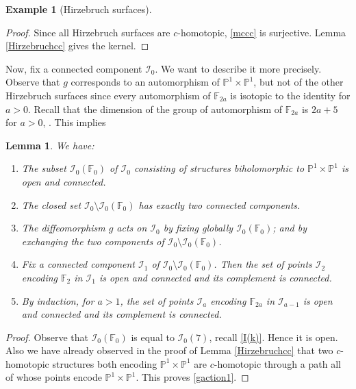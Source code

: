 \documentclass[JEP,XML,SOM,Unicode]{cedram}
\let\mathcal\mathscr
\theoremstyle{plain}
\newtheorem{lemma}[theorem]{Lemma}
\theoremstyle{definition}
\newtheorem{example}[theorem]{Example}
\theoremstyle{remark}
\numberwithin{equation}{section}
\newcommand{\cI}{\mathcal{I}}
\begin{document}
\begin{example}[Hirzebruch surfaces]
\begin{proof}
Since all Hirzebruch surfaces are $c$-homotopic, \eqref{mccc} is surjective. Lemma \ref{Hirzebruchcc} gives the kernel.
\end{proof}

Now, fix a connected component $\cI_0$. We want to describe it more precisely. Observe that $g$ corresponds to an automorphism of $\mathbb P^1\times\mathbb P^1$, but not of the other Hirzebruch surfaces since every automorphism of $\mathbb F_{2a}$ is isotopic to the identity for $a>0$. Recall that the dimension of the group of automorphism of $\mathbb F_{2a}$ is $2a+5$ for $a>0$, \cite[p.\,44]{MK}. This implies
\begin{lemma}
\label{gaction}
We have:
\begin{enumerate}
\item\label{gaction1}
The subset $\cI_0(\mathbb F_0)$ of $\cI_0$ consisting of structures biholomorphic to $\mathbb P^1\times\mathbb P^1$ is open and connected.
\item\label{gaction2}
The closed set $\cI_0\setminus \cI_0(\mathbb F_0)$ has exactly two connected components.
\item\label{gaction3}
The diffeomorphism $g$ acts on $\cI_0$ by fixing globally $\cI_0(\mathbb F_0)$; and by exchanging the two components of $\cI_0\setminus \cI_0(\mathbb F_0)$.
\item\label{gaction4}
Fix a connected component $\cI_1$ of $\cI_0\setminus \cI_0(\mathbb F_0)$. Then the set of points $\cI_2$ encoding $\mathbb F_2$ in $\cI_1$ is open and connected and its complement is connected.
\item\label{gaction5}
By induction, for $a>1$, the set of points $\cI_a$ encoding $\mathbb F_{2a}$ in $\cI_{a-1}$ is open and connected and its complement is connected.
\end{enumerate}
\end{lemma}

\begin{proof}
Observe that $\cI_0(\mathbb F_0)$ is equal to $\cI_0(7)$, recall \eqref{I(k)}. Hence it is open. Also we have already observed in the proof of Lemma \ref{Hirzebruchcc} that two $c$-homotopic structures both encoding $\mathbb P^1\times\mathbb P^1$ are $c$-homotopic through a path all of whose points encode $\mathbb P^1\times\mathbb P^1$. This proves \eqref{gaction1}.


\end{proof}
\end{example}
\end{document}
